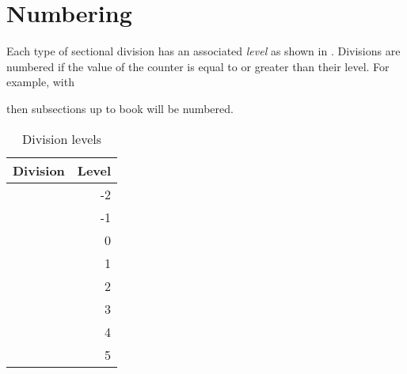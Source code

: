 \section{Numbering} \label{sec:secnumbers}

    Each type of sectional division has an 
associated \emph{level} as shown 
in .
Divisions are numbered if the value of the  counter
is equal to or greater than their level. For example, with
\begin{lcode}
\setcounter{secnumdepth}{2}
\end{lcode}
then subsections up to book will be numbered.

\begin{table}
\centering
\caption{Division levels} \label{tab:seclevels}
\begin{tabular}{lr} \toprule
Division       & Level \\ \midrule
\cmd{\book}           & -2 \\
\cmd{\part}           & -1 \\
\cmd{\chapter}        & 0 \\
\cmd{\section}        & 1 \\
\cmd{\subsection}     & 2 \\
\cmd{\subsubsection}  & 3 \\
\cmd{\paragraph}      & 4 \\
\cmd{\subparagraph}   & 5 \\ \bottomrule
\end{tabular}
\end{table}

